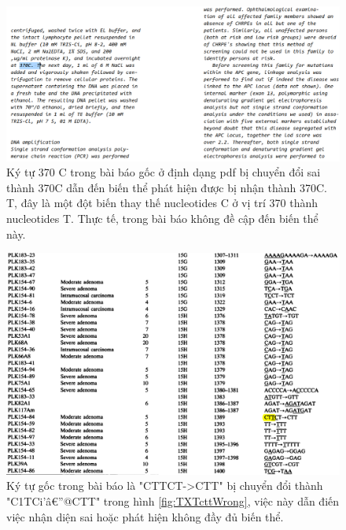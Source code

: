 \documentclass[../DoAn.tex]{subfiles}
\begin{document}
\begin{figure}
\centering
\includegraphics[width=1.05\linewidth]{Hinh_ve/TXTwrong37doC.png}
\caption{Ký tự 370 C trong bài báo gốc ở định dạng pdf bị chuyển đổi sai thành 370C dẫn đến biến thể phát hiện được bị nhận thành 370C. T, đây là một đột biến thay thế nucleotides C ở vị trí 370 thành nucleotides T. Thực tế, trong bài báo không đề cập đến biến thể này. }
\label{fig:TXTwrong37doC}
\end{figure}

\begin{figure}
\centering
\includegraphics[width=1.0\linewidth]{Hinh_ve/PDFcttWrong.png}
\caption{Ký tự gốc trong bài báo là "CTTCT->CTT" bị chuyển đổi thành "C1TCi'â€”@CTT" trong hình \ref{fig:TXTcttWrong}, việc này dẫn điến việc nhận diện sai hoặc phát hiện không đầy đủ biến thể.}
\label{fig:PDFcttWrong}
\end{figure}
\end{document}
